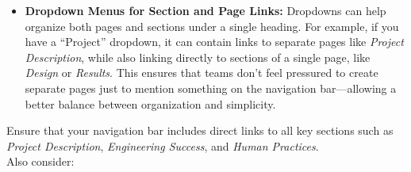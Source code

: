 \begin{itemize}
\item \textbf{Dropdown Menus for Section and Page Links:}
Dropdowns can help organize both pages and sections under a single heading.
For example, if you have a ``Project'' dropdown, it can contain links to separate pages like \textit{Project Description}, while also linking directly to sections of a single page, like \textit{Design} or \textit{Results}.
This ensures that teams don’t feel pressured to create separate pages just to mention something on the navigation bar—allowing a better balance between organization and simplicity.

\end{itemize}
Ensure that your navigation bar includes direct links to all key sections such as \textit{Project Description}, \textit{Engineering Success}, and \textit{Human Practices}. \\ \newline
Also consider:
